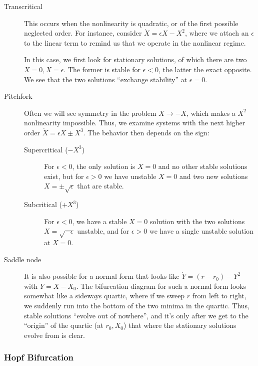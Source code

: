 \documentclass[12pt]{article}
\begin{document}
\begin{description}
    \item[Transcritical] This occurs when the nonlinearity is quadratic, or of
        the first possible neglected order. For instance, consider
        $\dot{X} = \epsilon X - X^2$, where we attach an $\epsilon$ to the
        linear term to remind us that we operate in the nonlinear regime.

        In this case, we first look for stationary solutions, of which there are
        two $X=0, X=\epsilon$. The former is stable for $\epsilon < 0$, the
        latter the exact opposite. We see that the two solutions ``exchange
        stability'' at $\epsilon = 0$.

    \item[Pitchfork] Often we will see symmetry in the problem $X \to -X$, which
        makes a $X^2$ nonlinearity impossible. Thus, we examine systems with the
        next higher order
        $\dot{X} = \epsilon X \pm X^3$.
        The behavior then depends on the sign:
        \begin{description}
            \item[Supercritical ($-X^3$)] For $\epsilon < 0$, the only solution
                is $X = 0$ and no other stable solutions exist, but for
                $\epsilon > 0$ we have unstable $X=0$ and two new solutions $X =
                \pm \sqrt{\epsilon}$ that are stable.
            \item[Subcritical ($+X^3$)] For $\epsilon < 0$, we have a stable
                $X=0$ solution with the two solutions $X = \sqrt{-\epsilon}$
                unstable, and for $\epsilon > 0$ we have a single unstable
                solution at $X=0$.
        \end{description}

    \item[Saddle node] It is also possible for a normal form that looks like
        $\dot{Y} = (r - r_0) - Y^2$
        with $Y = X - X_0$. The bifurcation diagram for such a normal form looks
        somewhat like a sideways quartic, where if we sweep $r$ from left to
        right, we suddenly run into the bottom of the two minima in the quartic.
        Thus, stable solutions ``evolve out of nowhere'', and it's only after we
        get to the ``origin'' of the quartic (at $r_0, X_0$) that where the
        stationary solutions evolve from is clear.
\end{description}

\subsubsection{Hopf Bifurcation}
\end{document}
